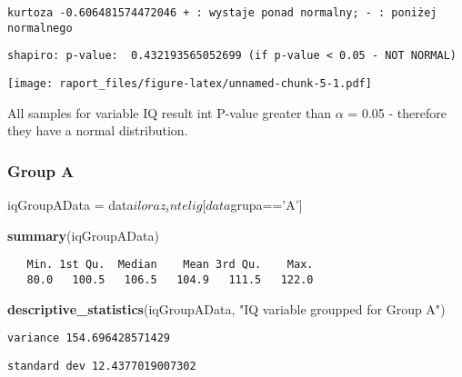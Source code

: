 \documentclass[]{article}
\newenvironment{Shaded}{\begin{snugshade}}{\end{snugshade}}
\newcommand{\KeywordTok}[1]{\textcolor[rgb]{0.13,0.29,0.53}{\textbf{{#1}}}}
\newcommand{\StringTok}[1]{\textcolor[rgb]{0.31,0.60,0.02}{{#1}}}
\newcommand{\NormalTok}[1]{{#1}}
\begin{document}
\begin{verbatim}
kurtoza -0.606481574472046 + : wystaje ponad normalny; - : poniżej normalnego
\end{verbatim}

\begin{verbatim}
shapiro: p-value:  0.432193565052699 (if p-value < 0.05 - NOT NORMAL)
\end{verbatim}

\texttt{[image: raport\_files/figure-latex/unnamed-chunk-5-1.pdf]}

All samples for variable IQ result int P-value greater than \(\alpha\) =
0.05 - therefore they have a normal distribution.

\subsubsection{Group A}\label{group-a}

\begin{Shaded}
\begin{Highlighting}[]
\NormalTok{iqGroupAData =}\StringTok{ }\NormalTok{data$iloraz_intelig[data$grupa==}\StringTok{'A'}\NormalTok{]}
\end{Highlighting}
\end{Shaded}

\begin{Shaded}
\begin{Highlighting}[]
\KeywordTok{summary}\NormalTok{(iqGroupAData)}
\end{Highlighting}
\end{Shaded}

\begin{verbatim}
   Min. 1st Qu.  Median    Mean 3rd Qu.    Max. 
   80.0   100.5   106.5   104.9   111.5   122.0 
\end{verbatim}

\begin{Shaded}
\begin{Highlighting}[]
\KeywordTok{descriptive_statistics}\NormalTok{(iqGroupAData, }\StringTok{"IQ variable groupped for Group A"}\NormalTok{)}
\end{Highlighting}
\end{Shaded}

\begin{verbatim}
variance 154.696428571429
\end{verbatim}

\begin{verbatim}
standard dev 12.4377019007302
\end{verbatim}
\end{document}
